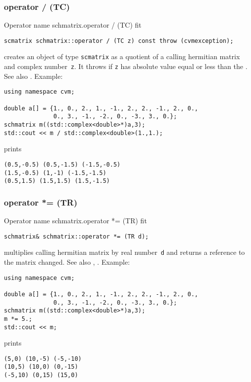 \subsubsection{operator / (TC)}
Operator%
\pdfdest name {schmatrix.operator / (TC)} fit
\begin{verbatim}
scmatrix schmatrix::operator / (TC z) const throw (cvmexception);
\end{verbatim}
creates an object of type \verb"scmatrix" as a quotient of
a calling hermitian matrix and  complex number~\verb"z". 
It throws
if \verb"z" has  absolute value equal or less than the
.
See also .
Example:
\begin{Verbatim}
using namespace cvm;

double a[] = {1., 0., 2., 1., -1., 2., 2., -1., 2., 0.,
              0., 3., -1., -2., 0., -3., 3., 0.};
schmatrix m((std::complex<double>*)a,3);
std::cout << m / std::complex<double>(1.,1.);
\end{Verbatim}
prints
\begin{Verbatim}
(0.5,-0.5) (0.5,-1.5) (-1.5,-0.5)
(1.5,-0.5) (1,-1) (-1.5,-1.5)
(0.5,1.5) (1.5,1.5) (1.5,-1.5)
\end{Verbatim}
\newpage



\subsubsection{operator *= (TR)}
Operator%
\pdfdest name {schmatrix.operator *= (TR)} fit
\begin{verbatim}
schmatrix& schmatrix::operator *= (TR d);
\end{verbatim}
multiplies  calling hermitian matrix by  real number~\verb"d"
and returns a reference to
the matrix changed.
See also ,
.
Example:
\begin{Verbatim}
using namespace cvm;

double a[] = {1., 0., 2., 1., -1., 2., 2., -1., 2., 0.,
              0., 3., -1., -2., 0., -3., 3., 0.};
schmatrix m((std::complex<double>*)a,3);
m *= 5.;
std::cout << m;
\end{Verbatim}
prints
\begin{Verbatim}
(5,0) (10,-5) (-5,-10)
(10,5) (10,0) (0,-15)
(-5,10) (0,15) (15,0)
\end{Verbatim}
\newpage




